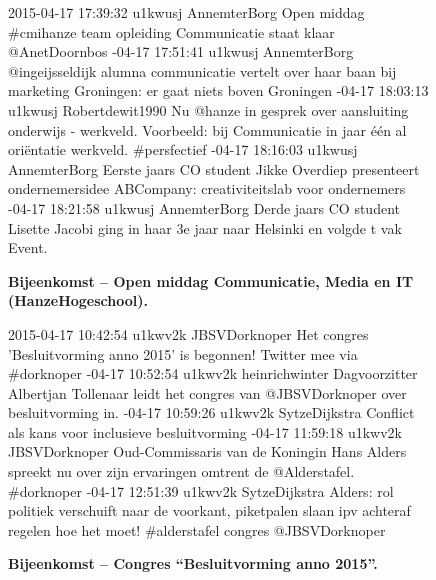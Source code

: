 {{\begin{figure}[H]
 \caption{\bf{Bijeenkomst} – Open middag Communicatie, Media en IT (HanzeHogeschool).}
\vspace*{-10pt} 
\begin{framed}
\footnotesize{
2015-04-17 17:39:32 u1kwusj AnnemterBorg Open middag \#cmihanze team opleiding Communicatie staat klaar @AnetDoornbos
-04-17 17:51:41 u1kwusj AnnemterBorg @ingeijsseldijk alumna communicatie vertelt over haar baan bij marketing Groningen: er gaat niets boven Groningen
-04-17 18:03:13 u1kwusj Robertdewit1990 Nu @hanze in gesprek over aansluiting onderwijs - werkveld. Voorbeeld: bij Communicatie in jaar één al oriëntatie werkveld. \#persfectief
-04-17 18:16:03 u1kwusj AnnemterBorg Eerste jaars CO student Jikke Overdiep presenteert ondernemersidee ABCompany: creativiteitslab voor ondernemers
-04-17 18:21:58 u1kwusj AnnemterBorg Derde jaars CO student Lisette Jacobi ging in haar 3e jaar naar Helsinki en volgde t vak Event.
}
\end{framed}
\end{figure}

\vspace*{-17pt} 
\begin{figure}[H]
 \caption{\bf{Bijeenkomst} – Congres ``Besluitvorming anno 2015''.}
\vspace*{-10pt} 
\begin{framed}
\footnotesize{
2015-04-17 10:42:54 u1kwv2k JBSVDorknoper Het congres 'Besluitvorming anno 2015' is begonnen! Twitter mee via \#dorknoper
-04-17 10:52:54 u1kwv2k heinrichwinter Dagvoorzitter Albertjan Tollenaar leidt het congres van @JBSVDorknoper over besluitvorming in.
-04-17 10:59:26 u1kwv2k SytzeDijkstra Conflict als kans voor inclusieve besluitvorming
-04-17 11:59:18 u1kwv2k JBSVDorknoper Oud-Commissaris van de Koningin Hans Alders spreekt nu over zijn ervaringen omtrent de @Alderstafel. \#dorknoper
-04-17 12:51:39 u1kwv2k SytzeDijkstra Alders: rol politiek verschuift naar de voorkant, piketpalen slaan ipv achteraf regelen hoe het moet! \#alderstafel congres @JBSVDorknoper}
\end{framed}
\end{figure}

}}
